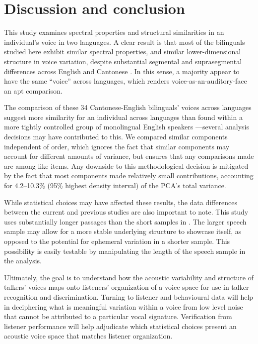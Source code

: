 \section{Discussion and conclusion}\label{ch3:sec:discussion}

This study examines spectral properties and structural similarities in an individual's voice in two languages. A clear result is that most of the bilinguals studied here exhibit similar spectral properties, and similar lower-dimensional structure in voice variation, despite substantial segmental and suprasegmental differences across English and Cantonese \citep{matthews_2013_cantonese}. In this sense, a majority appear to have the same ``voice'' across languages, which renders voice-as-an-auditory-face an apt comparison.

The comparison of these 34 Cantonese-English bilinguals' voices across languages suggest more similarity for an individual across languages than found within a more tightly controlled group of monolingual English speakers \citep{lee_2019_acoustic-paper}---several analysis decisions may have contributed to this. We compared similar components independent of order, which ignores the fact that similar components may account for different amounts of variance, but ensures that any comparisons made are among like items. Any downside to this methodological decision is mitigated by the fact that most components made relatively small contributions, accounting for 4.2--10.3\% (95\% highest density interval) of the PCA's total variance. 

While statistical choices may have affected these results, the data differences between the current and previous studies are also important to note. This study uses substantially longer passages than the short samples in \citet{lee_2019_acoustic-paper}. The larger speech sample may allow for a more stable underlying structure to showcase itself, as opposed to the potential for ephemeral variation in a shorter sample. This possibility is easily testable by manipulating the length of the speech sample in the analysis.

Ultimately, the goal is to understand how the acoustic variability and structure of talkers' voices maps onto listeners' organization of a voice space for use in talker recognition and discrimination. Turning to listener and behavioural data will help in deciphering what is meaningful variation within a voice from low level noise that cannot be attributed to a particular vocal signature. Verification from listener performance will help adjudicate which statistical choices present an acoustic voice space that matches listener organization. 

